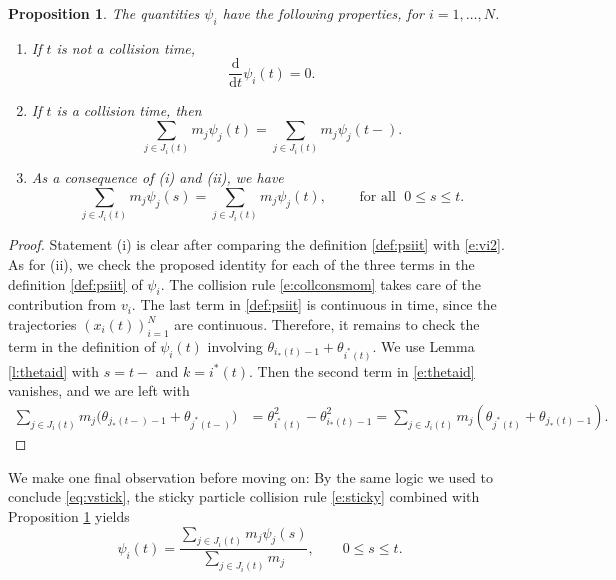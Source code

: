 \documentclass[10pt,a4paper]{amsart}
\newtheorem{proposition}[theorem]{Proposition}
\def\dd{\mathrm{d}}
\begin{document}
	\newpage
	\begin{proposition}\label{prop:psii}
		The quantities $\psi_i$ have the following properties, for $i = 1,\ldots, N$.
		\begin{enumerate}[label = \emph{(\roman*)}]
			\item If $t$ is not a collision time, 
			\begin{equation}
				\label{eq:psii0}
				\frac{\dd}{\dd t}\psi_i(t) = 0.
			\end{equation}
			\item  If $t$ is a collision time, then
			\begin{equation}
				\sum_{j\in J_i(t)} m_j\psi_{j}(t) = \sum_{j\in J_i(t)} m_{j}\psi_{j}(t-).
			\end{equation}
			\item As a consequence of \emph{(i)} and \emph{(ii)}, we have 
			\begin{equation}\label{eq:psiit}
				\sum_{j\in J_i(t)} m_j\psi_{j}(s) = \sum_{j\in J_i(t)} m_{j}\psi_{j}(t),\qquad \text{ for all }\; 0\le s\le t.
			\end{equation}
		\end{enumerate}	
	\end{proposition}
	\begin{proof}
		Statement (i) is clear after comparing the definition \eqref{def:psiit} with \eqref{e:vi2}. As for (ii), we check the proposed identity for each of the three terms in the definition \eqref{def:psiit} of $\psi_i$.  The collision rule \eqref{e:collconsmom} takes care of the contribution from $v_i$.  The last term in  \eqref{def:psiit} is continuous in time, since the trajectories $(x_i(t))_{i=1}^N$ are continuous.  
		Therefore, it remains to check the term in the definition of $\psi_i(t)$ involving $\theta_{i_*(t)-1} + \theta_{i^*(t)}$.  We use Lemma \ref{l:thetaid} with $s = t-$ and $k = i^*(t)$. Then the second term in \eqref{e:thetaid} vanishes, and we are left with
		\begin{align*}
			\sum_{j\in J_i(t)} m_{j}\big(\theta_{j_*(t-)-1}+\theta_{j^*(t-)}\big)
			& = \theta_{i^*(t)}^2 - \theta_{i_*(t)-1}^2 = 
			\sum_{j\in J_i(t)} m_j (\theta_{j^*(t)} + \theta_{j_*(t)-1}).
		\end{align*}
	\end{proof}
	

	
	We make one final observation before moving on: By the same logic we used to conclude \eqref{eq:vstick}, the sticky particle collision rule \eqref{e:sticky} combined with Proposition \ref{prop:psii} yields
	\begin{equation}
		\psi_i(t) = \frac{\sum_{j\in J_i(t)} m_j \psi_j(s)}{\sum_{j\in J_i(t)} m_j},
		\qquad 0\le s\le t.
	\end{equation}
	
\end{document}
